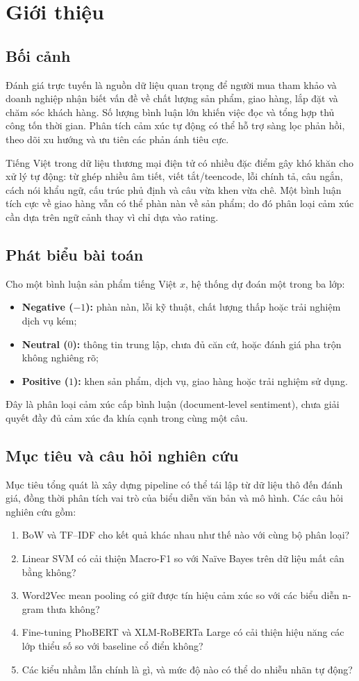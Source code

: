 \chapter{Giới thiệu}

\section{Bối cảnh}
Đánh giá trực tuyến là nguồn dữ liệu quan trọng để người mua tham khảo và doanh nghiệp nhận biết vấn đề về chất lượng sản phẩm, giao hàng, lắp đặt và chăm sóc khách hàng. Số lượng bình luận lớn khiến việc đọc và tổng hợp thủ công tốn thời gian. Phân tích cảm xúc tự động có thể hỗ trợ sàng lọc phản hồi, theo dõi xu hướng và ưu tiên các phản ánh tiêu cực.

Tiếng Việt trong dữ liệu thương mại điện tử có nhiều đặc điểm gây khó khăn cho xử lý tự động: từ ghép nhiều âm tiết, viết tắt/teencode, lỗi chính tả, câu ngắn, cách nói khẩu ngữ, cấu trúc phủ định và câu vừa khen vừa chê. Một bình luận tích cực về giao hàng vẫn có thể phàn nàn về sản phẩm; do đó phân loại cảm xúc cần dựa trên ngữ cảnh thay vì chỉ dựa vào rating.

\section{Phát biểu bài toán}
Cho một bình luận sản phẩm tiếng Việt $x$, hệ thống dự đoán một trong ba lớp:
\begin{itemize}
  \item \textbf{Negative ($-1$):} phàn nàn, lỗi kỹ thuật, chất lượng thấp hoặc trải nghiệm dịch vụ kém;
  \item \textbf{Neutral ($0$):} thông tin trung lập, chưa đủ căn cứ, hoặc đánh giá pha trộn không nghiêng rõ;
  \item \textbf{Positive ($1$):} khen sản phẩm, dịch vụ, giao hàng hoặc trải nghiệm sử dụng.
\end{itemize}
Đây là phân loại cảm xúc cấp bình luận (document-level sentiment), chưa giải quyết đầy đủ cảm xúc đa khía cạnh trong cùng một câu.

\section{Mục tiêu và câu hỏi nghiên cứu}
Mục tiêu tổng quát là xây dựng pipeline có thể tái lập từ dữ liệu thô đến đánh giá, đồng thời phân tích vai trò của biểu diễn văn bản và mô hình. Các câu hỏi nghiên cứu gồm:
\begin{enumerate}
  \item BoW và TF--IDF cho kết quả khác nhau như thế nào với cùng bộ phân loại?
  \item Linear SVM có cải thiện Macro-F1 so với Naïve Bayes trên dữ liệu mất cân bằng không?
  \item Word2Vec mean pooling có giữ được tín hiệu cảm xúc so với các biểu diễn n-gram thưa không?
  \item Fine-tuning PhoBERT và XLM-RoBERTa Large có cải thiện hiệu năng các lớp thiểu số so với baseline cổ điển không?
  \item Các kiểu nhầm lẫn chính là gì, và mức độ nào có thể do nhiễu nhãn tự động?
\end{enumerate}

